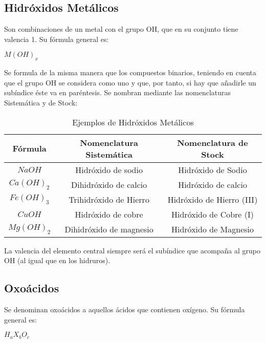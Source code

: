 \subsection{Hidróxidos Metálicos}
Son combinaciones de un metal con el grupo OH, que en su conjunto tiene valencia 1. Su fórmula general es:
\begin{center}
	$M(OH)_x$
\end{center}
Se formula de la misma manera que los compuestos binarios, teniendo en cuenta que el grupo OH se considera como uno y que, por tanto, si hay que añadirle un subíndice éste va en paréntesis. Se nombran mediante las nomenclaturas Sistemática y de Stock:
\begin{table}[h!]
	\centering
	\begin{tabular}{c|cc}
		Fórmula&Nomenclatura Sistemática&Nomenclatura de Stock\\ \hline
		$NaOH$&Hidróxido de sodio&Hidróxido de Sodio\\ 
		$Ca(OH)_{2}$&Dihidróxido de calcio&Hidróxido de calcio\\
		$Fe(OH)_{3}$&Trihidróxido de Hierro&Hidróxido de Hierro (III)\\
		$CuOH$&Hidróxido de cobre&Hidróxido de Cobre (I)\\
		$Mg(OH)_{2}$&Dihidróxido de magnesio&Hidróxido de Magnesio\\ \hline
	\end{tabular}
	\caption{Ejemplos de Hidróxidos Metálicos}
\end{table}
La valencia del elemento central siempre será el subíndice que acompaña al grupo OH (al igual que en los hidruros).
\subsection{Oxoácidos}
Se denominan oxoácidos a aquellos ácidos que contienen oxígeno. Su fórmula general es:
\begin{center}
	$H_{a}X_{b}O_{c}$
\end{center}

